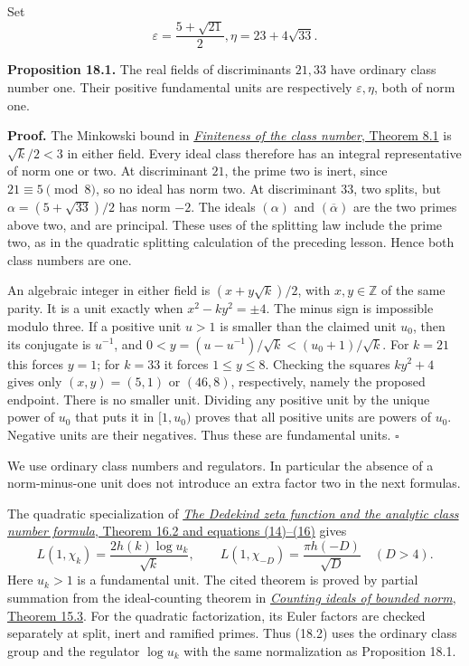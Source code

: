 \documentclass[
  11pt,
  a4paper,
]{article}
\begin{document}
Set \[
 \varepsilon=\frac{5+\sqrt{21}}2,
 \eta=23+4\sqrt{33}.
 \tag{18.1}
\]

\textbf{Proposition 18.1.} The real fields of discriminants \(21,33\)
have ordinary class number one. Their positive fundamental units are
respectively \(\varepsilon,\eta\), both of norm one.

\textbf{Proof.} The Minkowski bound in
\href{https://kokunoyumeto.github.io/open-math-courses-public/courses/NT-ANT/finiteness-of-the-class-number.html}{\emph{Finiteness
of the class number}, Theorem 8.1} is \(\sqrt{k}/2<3\) in either field.
Every ideal class therefore has an integral representative of norm one
or two. At discriminant \(21\), the prime two is inert, since
\(21\equiv5\pmod8\), so no ideal has norm two. At discriminant \(33\),
two splits, but \(\alpha=(5+\sqrt{33})/2\) has norm \(-2\). The ideals
\((\alpha)\) and \((\overline\alpha)\) are the two primes above two, and
are principal. These uses of the splitting law include the prime two, as
in the quadratic splitting calculation of the preceding lesson. Hence
both class numbers are one.

An algebraic integer in either field is \((x+y\sqrt{k})/2\), with
\(x,y\in\mathbb Z\) of the same parity. It is a unit exactly when
\(x^2-ky^2=\pm4\). The minus sign is impossible modulo three. If a
positive unit \(u>1\) is smaller than the claimed unit \(u_0\), then its
conjugate is \(u^{-1}\), and
\(0<y=(u-u^{-1})/\sqrt{k}<(u_0+1)/\sqrt{k}\). For \(k=21\) this forces
\(y=1\); for \(k=33\) it forces \(1\le y\le8\). Checking the squares
\(ky^2+4\) gives only \((x,y)=(5,1)\) or \((46,8)\), respectively,
namely the proposed endpoint. There is no smaller unit. Dividing any
positive unit by the unique power of \(u_0\) that puts it in \([1,u_0)\)
proves that all positive units are powers of \(u_0\). Negative units are
their negatives. Thus these are fundamental units. \(\square\)

We use ordinary class numbers and regulators. In particular the absence
of a norm-minus-one unit does not introduce an extra factor two in the
next formulas.

The quadratic specialization of
\href{https://kokunoyumeto.github.io/open-math-courses-public/courses/NT-ANT/the-dedekind-zeta-function-and-the-analytic-class-number-formula.html}{\emph{The
Dedekind zeta function and the analytic class number formula}, Theorem
16.2 and equations (14)--(16)} gives \[
 L(1,\chi_k)=\frac{2h(k)\log u_k}{\sqrt{k}},\qquad
 L(1,\chi_{-D})=\frac{\pi h(-D)}{\sqrt D}\quad(D>4).
 \tag{18.2}
\] Here \(u_k>1\) is a fundamental unit. The cited theorem is proved by
partial summation from the ideal-counting theorem in
\href{https://kokunoyumeto.github.io/open-math-courses-public/courses/NT-ANT/counting-ideals-of-bounded-norm.html}{\emph{Counting
ideals of bounded norm}, Theorem 15.3}. For the quadratic factorization,
its Euler factors are checked separately at split, inert and ramified
primes. Thus (18.2) uses the ordinary class group and the regulator
\(\log u_k\) with the same normalization as Proposition 18.1.
\end{document}
